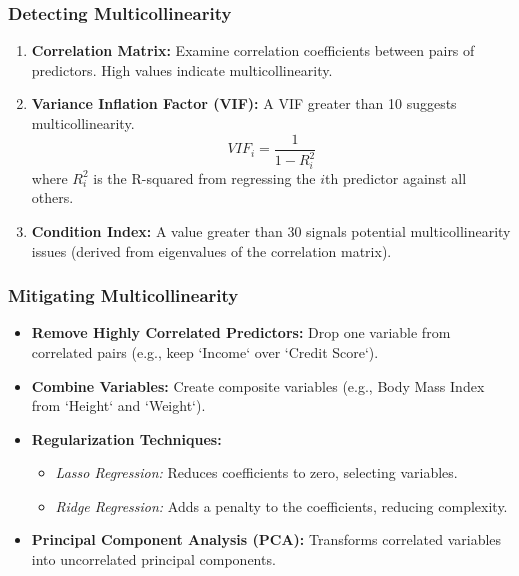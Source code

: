 \documentclass[aspectratio=169]{beamer}
\begin{document}
\begin{frame}[fragile]
    \frametitle{Detecting Multicollinearity}
    \begin{enumerate}
        \item \textbf{Correlation Matrix:} Examine correlation coefficients between pairs of predictors. High values indicate multicollinearity.
        \item \textbf{Variance Inflation Factor (VIF):} A VIF greater than 10 suggests multicollinearity.
        \begin{equation}
            VIF_i = \frac{1}{1 - R^2_i}
        \end{equation}
        where \(R^2_i\) is the R-squared from regressing the \(i\)th predictor against all others.
        \item \textbf{Condition Index:} A value greater than 30 signals potential multicollinearity issues (derived from eigenvalues of the correlation matrix).
    \end{enumerate}
\end{frame}

\begin{frame}[fragile]
    \frametitle{Mitigating Multicollinearity}
    \begin{itemize}
        \item \textbf{Remove Highly Correlated Predictors:} Drop one variable from correlated pairs (e.g., keep `Income` over `Credit Score`).
        \item \textbf{Combine Variables:} Create composite variables (e.g., Body Mass Index from `Height` and `Weight`).
        \item \textbf{Regularization Techniques:}
        \begin{itemize}
            \item \textit{Lasso Regression:} Reduces coefficients to zero, selecting variables.
            \item \textit{Ridge Regression:} Adds a penalty to the coefficients, reducing complexity.
        \end{itemize}
        \item \textbf{Principal Component Analysis (PCA):} Transforms correlated variables into uncorrelated principal components.
    \end{itemize}
\end{frame}
\end{document}
